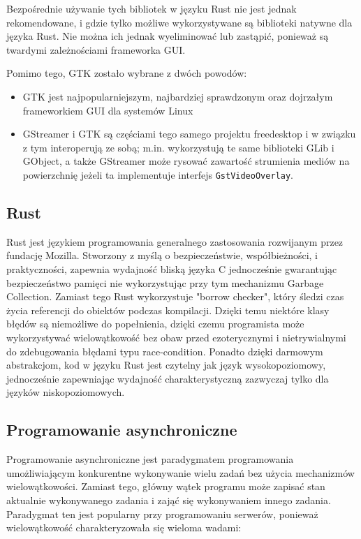 Bezpośrednie używanie tych bibliotek w języku Rust nie jest jednak rekomendowane, i gdzie tylko
możliwe wykorzystywane są biblioteki natywne dla języka Rust. Nie można ich jednak wyeliminować lub
zastąpić, ponieważ są twardymi zależnościami frameworka GUI.

Pomimo tego, GTK zostało wybrane z dwóch powodów:

\begin{itemize}
    \item GTK jest najpopularniejszym, najbardziej sprawdzonym oraz dojrzałym frameworkiem GUI dla
          systemów Linux
    \item GStreamer i GTK są częściami tego samego projektu freedesktop i w związku z tym
          interoperują ze sobą; m.in. wykorzystują te same biblioteki GLib i GObject, a także
          GStreamer może rysować zawartość strumienia mediów na powierzchnię jeżeli ta
          implementuje interfejs \verb|GstVideoOverlay|.
\end{itemize}

\subsection{Rust}

Rust jest językiem programowania generalnego zastosowania rozwijanym przez fundację Mozilla.
Stworzony z myślą o bezpieczeństwie, współbieżności, i praktyczności, zapewnia wydajność bliską
języka C jednocześnie gwarantując bezpieczeństwo pamięci nie wykorzystując przy tym mechanizmu
Garbage Collection. Zamiast tego Rust wykorzystuje "borrow checker", który śledzi czas życia
referencji do obiektów podczas kompilacji. Dzięki temu niektóre klasy błędów są niemożliwe do
popełnienia, dzięki czemu programista może wykorzystywać wielowątkowość bez obaw przed ezoterycznymi
i nietrywialnymi do zdebugowania błędami typu race-condition. Ponadto dzięki darmowym abstrakcjom,
kod w języku Rust jest czytelny jak język wysokopoziomowy, jednocześnie zapewniając wydajność
charakterystyczną zazwyczaj tylko dla języków niskopoziomowych.

\subsection{Programowanie asynchroniczne}

Programowanie asynchroniczne jest paradygmatem programowania umożliwiającym konkurentne wykonywanie
wielu zadań bez użycia mechanizmów wielowątkowości. Zamiast tego, główny wątek programu może zapisać
stan aktualnie wykonywanego zadania i zająć się wykonywaniem innego zadania. Paradygmat ten
jest popularny przy programowaniu serwerów, ponieważ wielowątkowość charakteryzowała się wieloma
wadami:

